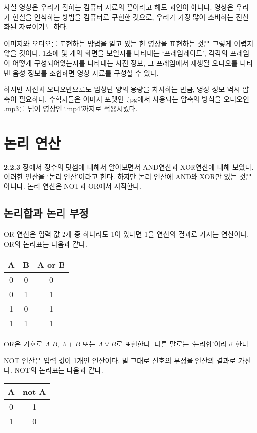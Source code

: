\documentclass{article}
\begin{document}
사실 영상은 우리가 접하는 컴퓨터 자료의 끝이라고 해도 과언이 아니다.
영상은 우리가 현실을 인식하는 방법을 컴퓨터로 구현한 것으로, 우리가 가장 많이 소비하는
전산화된 자료이기도 하다.

이미지와 오디오를 표현하는 방법을 알고 있는 한 영상을 표현하는 것은 그렇게 어렵지 않을 것이다.
1초에 몇 개의 화면을 보일지를 나타내는 `프레임레이트', 각각의 프레임이 어떻게 구성되어있는지를
나타내는 사진 정보, 그 프레임에서 재생될 오디오를 나타낸 음성 정보를 조합하면 영상 자료를
구성할 수 있다.

하지만 사진과 오디오만으로도 엄청난 양의 용량을 차지하는 만큼, 영상 정보 역시 압축이 필요하다.
수학자들은 이미지 포맷인 .jpg에서 사용되는 압축의 방식을 오디오인 .mp3를 넘어
영상인 `.mp4'까지로 적용시켰다.

\section{논리 연산}

\textbf{2.2.3} 장에서 정수의 덧셈에 대해서 알아보면서 AND연산과 XOR연산에 대해 보았다. 이러한 연산을 `논리
연산'이라고 한다. 하지만 논리 연산에 AND와 XOR만 있는 것은 아니다. 논리 연산은 NOT과 OR에서
시작한다.

\subsection{논리합과 논리 부정}

OR 연산은 입력 값 2개 중 하나라도 1이 있다면 1을 연산의 결과로 가지는 연산이다.
OR의 논리표는 다음과 같다.

\begin{center}
    \begin{tabular}{cc|c}
        A & B & A or B \\
        \hline
        0 & 0 & 0 \\
        0 & 1 & 1 \\
        1 & 0 & 1 \\
        1 & 1 & 1
    \end{tabular}
\end{center}

OR은 기호로 $A | B$, $A + B$ 또는 $A \vee B$로 표현한다. 다른 말로는 `논리합'이라고 한다.

NOT 연산은 입력 값이 1개인 연산이다. 말 그대로 신호의 부정을 연산의 결과로 가진다.
NOT의 논리표는 다음과 같다.

\begin{center}
    \begin{tabular}{c|c}
        A & not A \\
        \hline
        0 & 1 \\
        1 & 0
    \end{tabular}
\end{center}
\end{document}
